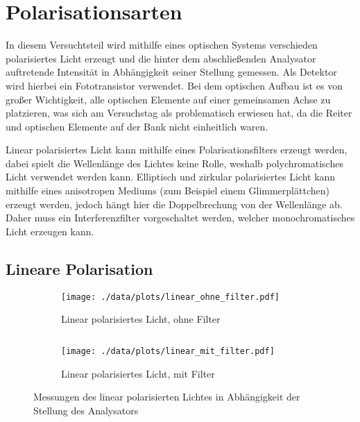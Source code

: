 \chapter{Polarisationsarten}
In diesem Versuchtsteil wird mithilfe eines optischen Systems verschieden polarisiertes Licht erzeugt und die hinter dem abschließenden Analysator auftretende Intensität in Abhängigkeit seiner Stellung gemessen.
Als Detektor wird hierbei ein Fototransistor verwendet.
Bei dem optischen Aufbau ist es von großer Wichtigkeit, alle optischen Elemente auf einer gemeinsamen Achse zu platzieren, was sich am Versuchstag als problematisch erwiesen hat, da die Reiter und optischen Elemente auf der Bank nicht einheitlich waren.\par
Linear polarisiertes Licht kann mithilfe eines Polarisationsfilters erzeugt werden, dabei spielt die Wellenlänge des Lichtes keine Rolle, weshalb polychromatisches Licht verwendet werden kann.
Elliptisch und zirkular polarisiertes Licht kann mithilfe eines anisotropen Mediums (zum Beispiel einem Glimmerplättchen) erzeugt werden, jedoch hängt hier die Doppelbrechung von der Wellenlänge ab.
Daher muss ein Interferenzfilter vorgeschaltet werden, welcher monochromatisches Licht erzeugen kann.

\section{Lineare Polarisation}
\begin{figure}[tb]
	\begin{subfigure}{.4\textwidth}
		\centering
		\texttt{[image: ./data/plots/linear\_ohne\_filter.pdf]}
		\caption[ohne Filter]{Linear polarisiertes Licht, ohne Filter}
	\end{subfigure}
	$\quad$
	\begin{subfigure}{.4\textwidth}
		\centering
		\texttt{[image: ./data/plots/linear\_mit\_filter.pdf]}
		\caption[mit Filter]{Linear polarisiertes Licht, mit Filter}
	\end{subfigure}
	\caption[Linear polarisiertes Licht]{Messungen des linear polarisierten Lichtes in Abhängigkeit der Stellung des Analysators}
	\label{fig:meas_lin}
\end{figure}
